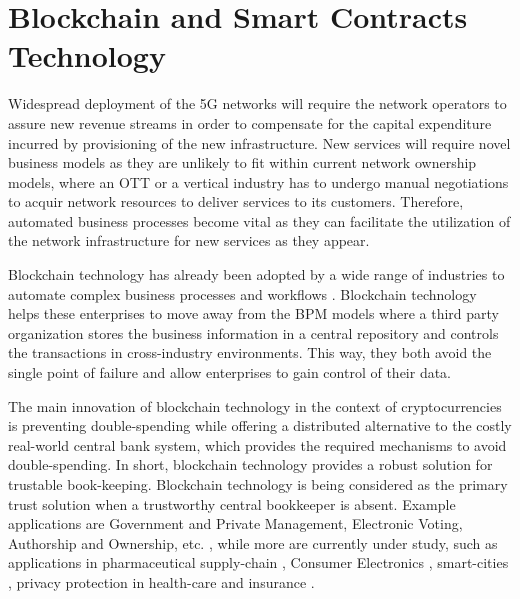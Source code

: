 \section{Blockchain and Smart Contracts Technology}
\label{Back:Sec:blockchain}



Widespread deployment of the \ac{5G} networks will require the network operators to assure new revenue streams in order to compensate for the capital expenditure incurred by provisioning of the new infrastructure. New services will require novel business models as they are unlikely to fit within current network ownership models, where an \ac{OTT} or a vertical industry has to undergo manual negotiations to acquir network resources to deliver services to its customers. Therefore, automated business processes become vital as they can facilitate the utilization of the network infrastructure for new services as they appear.


Blockchain technology has already been adopted by a wide range of industries to automate complex business processes and workflows \cite{fridgen2018cross,milani2016blockchain}. Blockchain technology helps these enterprises to move away from the \ac{BPM} models where a third party organization stores the business information in a central repository and controls the transactions in cross-industry environments. This way, they both avoid the single point of failure and allow enterprises to gain control of their data.

The main innovation of  blockchain technology in the context of cryptocurrencies is preventing double-spending while offering a distributed alternative to the costly real-world central bank system, which provides the required mechanisms to avoid double-spending. In short, blockchain technology provides a robust solution for trustable book-keeping. Blockchain technology is being considered as the primary trust solution when a trustworthy central bookkeeper is absent. Example applications are Government and Private Management, Electronic Voting, Authorship and Ownership, etc. \cite{8552978}, while more are currently under study, such as applications in pharmaceutical supply-chain \cite{7987376}, Consumer Electronics \cite{8386955}, smart-cities \cite{8386958}, privacy protection in health-care \cite{8386918} and insurance \cite{8386868}. 


